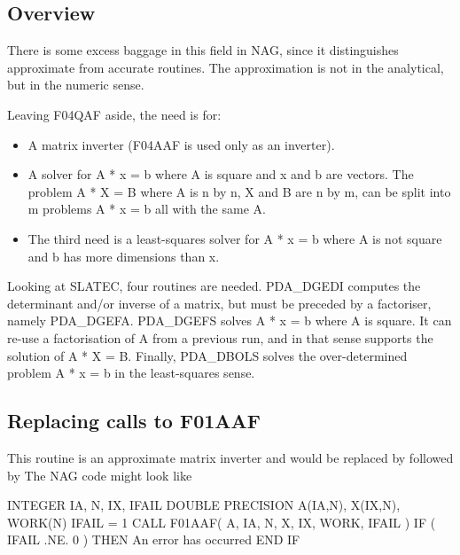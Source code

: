 \documentclass[11pt,twoside,nolof]{starlink}
\begin{document}

\subsection{Overview}

   There is some excess baggage in this field in NAG, since it
   distinguishes approximate from accurate routines. The approximation
   is not in the analytical, but in the numeric sense.

   Leaving F04QAF aside, the need is for:

\begin{itemize}
\item A matrix inverter (F04AAF is used only as an inverter).
\item A solver for A * x = b where A is square and x and b are vectors.
   The problem A * X = B where A is n by n, X and B are n by m, can be
   split into m problems A * x = b all with the same A.
\item The third need is a least-squares solver for A * x = b where A is
   not square and b has more dimensions than x.
\end{itemize}

   Looking at SLATEC, four routines are needed. PDA\_DGEDI computes the
   determinant and/or inverse of a matrix, but must be preceded by a
   factoriser, namely PDA\_DGEFA. PDA\_DGEFS solves A * x = b where A is square.
   It can re-use a factorisation of A from a previous run, and in that
   sense supports the solution of A * X = B. Finally, PDA\_DBOLS solves the
   over-determined problem A * x = b in the least-squares sense.


\subsection{Replacing calls to F01AAF}

   This routine is an approximate matrix inverter and would be replaced
   by
   followed by
   The NAG code might look like

\begin{terminalv}
      INTEGER IA, N, IX, IFAIL
      DOUBLE PRECISION A(IA,N), X(IX,N), WORK(N)
      IFAIL = 1
      CALL F01AAF( A, IA, N, X, IX, WORK, IFAIL )
      IF ( IFAIL .NE. 0 ) THEN
         An error has occurred
      END IF
\end{terminalv}
\end{document}
